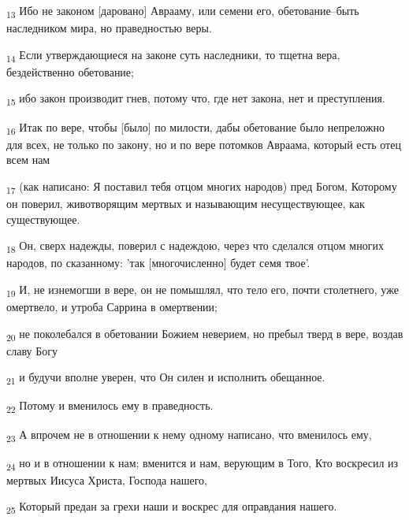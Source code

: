 \begin{tcolorbox}
\textsubscript{13} Ибо не законом [даровано] Аврааму, или семени его, обетование--быть наследником мира, но праведностью веры.
\end{tcolorbox}
\begin{tcolorbox}
\textsubscript{14} Если утверждающиеся на законе суть наследники, то тщетна вера, бездейственно обетование;
\end{tcolorbox}
\begin{tcolorbox}
\textsubscript{15} ибо закон производит гнев, потому что, где нет закона, нет и преступления.
\end{tcolorbox}
\begin{tcolorbox}
\textsubscript{16} Итак по вере, чтобы [было] по милости, дабы обетование было непреложно для всех, не только по закону, но и по вере потомков Авраама, который есть отец всем нам
\end{tcolorbox}
\begin{tcolorbox}
\textsubscript{17} (как написано: Я поставил тебя отцом многих народов) пред Богом, Которому он поверил, животворящим мертвых и называющим несуществующее, как существующее.
\end{tcolorbox}
\begin{tcolorbox}
\textsubscript{18} Он, сверх надежды, поверил с надеждою, через что сделался отцом многих народов, по сказанному: 'так [многочисленно] будет семя твое'.
\end{tcolorbox}
\begin{tcolorbox}
\textsubscript{19} И, не изнемогши в вере, он не помышлял, что тело его, почти столетнего, уже омертвело, и утроба Саррина в омертвении;
\end{tcolorbox}
\begin{tcolorbox}
\textsubscript{20} не поколебался в обетовании Божием неверием, но пребыл тверд в вере, воздав славу Богу
\end{tcolorbox}
\begin{tcolorbox}
\textsubscript{21} и будучи вполне уверен, что Он силен и исполнить обещанное.
\end{tcolorbox}
\begin{tcolorbox}
\textsubscript{22} Потому и вменилось ему в праведность.
\end{tcolorbox}
\begin{tcolorbox}
\textsubscript{23} А впрочем не в отношении к нему одному написано, что вменилось ему,
\end{tcolorbox}
\begin{tcolorbox}
\textsubscript{24} но и в отношении к нам; вменится и нам, верующим в Того, Кто воскресил из мертвых Иисуса Христа, Господа нашего,
\end{tcolorbox}
\begin{tcolorbox}
\textsubscript{25} Который предан за грехи наши и воскрес для оправдания нашего.
\end{tcolorbox}
